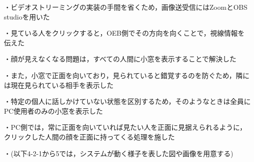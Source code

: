 ・ビデオストリーミングの実装の手間を省くため，画像送受信にはZoomとOBS studioを用いた

・見ている人をクリックすると，OEB側でその方向を向くことで，視線情報を伝えた

・顔が見えなくなる問題は，すべての人間に小窓を表示することで解決した

・また，小窓で正面を向いており，見られていると錯覚するのを防ぐため，隣には現在見られている相手を表示した

・特定の個人に話しかけていない状態を区別するため，そのようなときは全員にPC使用者のみの小窓を表示した

・PC側では，常に正面を向いていれば見たい人を正面に見据えられるように，クリックした人間の顔を正面に持ってくる処理を施した

・(以下4-2-1から5では，システムが動く様子を表した図や画像を用意する)
